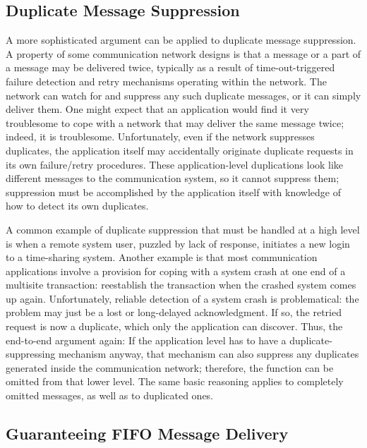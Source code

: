 \documentclass[a4paper,12pt,notitlepage,twoside,openright]{article}
\begin{document}
\hypertarget{duplicate-message-suppression}{%
\subsection{Duplicate Message
Suppression}\label{duplicate-message-suppression}}

A more sophisticated argument can be applied to duplicate message
suppression. A property of some communication network designs is that
a message or a part of a message may be delivered twice, typically as
a result of time-out-triggered failure detection and retry mechanisms
operating within the network. The network can watch for and suppress
any such duplicate messages, or it can simply deliver them. One might
expect that an application would find it very troublesome to cope with
a network that may deliver the same message twice; indeed, it is
troublesome. Unfortunately, even if the network suppresses duplicates,
the application itself may accidentally originate duplicate requests
in its own failure/retry procedures. These application-level
duplications look like different messages to the communication
system, so it cannot suppress them; suppression must be accomplished
by the application itself with knowledge of how to detect
its own duplicates.

A common example of duplicate suppression that must be handled at a high
level is when a remote system user, puzzled by lack of response,
initiates a new login to a time-sharing system. Another example is that
most communication applications involve a provision for coping with a
system crash at one end of a multisite transaction: reestablish the
transaction when the crashed system comes up again. Unfortunately,
reliable detection of a system crash is problematical: the problem may
just be a lost or long-delayed acknowledgment. If so, the retried
request is now a duplicate, which only the application can discover.
Thus, the end-to-end argument again: If the application level has to
have a duplicate-suppressing mechanism anyway, that mechanism can also
suppress any duplicates generated inside the communication network; therefore, the
function can be omitted from that lower level. The same basic reasoning
applies to completely omitted messages, as well as to duplicated ones.


\hypertarget{guaranteeing-fifo-message-delivery}{%
\subsection{Guaranteeing FIFO Message
Delivery}\label{guaranteeing-fifo-message-delivery}}
\end{document}
